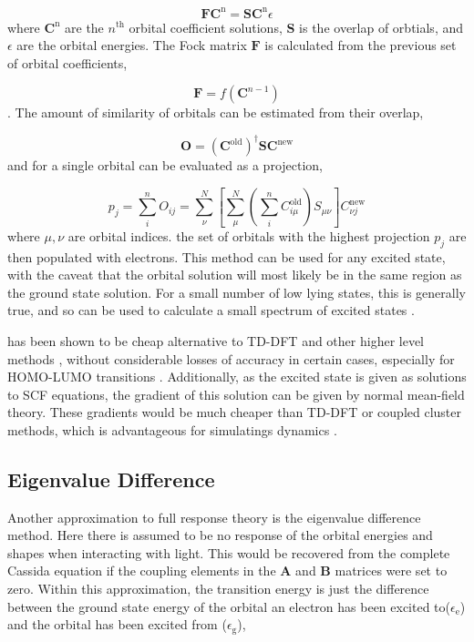 \begin{equation}
\mathbf{F} \mathbf{C}^{\text{n}} = \mathbf{S} \mathbf{C}^{\text{n}} \epsilon
\label{eq:roothaan_hall}
\end{equation}
%
where $\mathbf{C}^{\text{n}}$ are the $n^{\text{th}}$ orbital coefficient solutions, 
$\mathbf{S}$ is the overlap of orbtials, and $\epsilon$ are the orbital energies. 
The Fock matrix $\mathbf{F}$ is calculated from the previous set of orbital 
coefficients,

\begin{equation}
\mathbf{F} = f\left(\mathbf{C}^{n-1}\right)
\end{equation}
%
. The amount of similarity of orbitals can be estimated from their overlap,

\begin{equation}
\mathbf{O} = \left(\mathbf{C}^{\text{old}}\right)^\dagger \mathbf{S} \mathbf{C}^{\text{new}}
\end{equation}
%
and for a single orbital can be evaluated as a projection,

\begin{equation}
p_j = \sum^n_i O_{ij} = \sum^N_\nu \left[\sum^N_\mu\left(\sum^n_i C_{i\mu}^{\text{old}}\right)S_{\mu\nu}\right]C^{\text{new}}_{\nu j}
\end{equation}
%
where $\mu,\nu$ are orbital indices. the set of orbitals with the highest projection
$p_j$ are then populated with electrons.  This method can be used for any
excited state, with the caveat that the orbital solution will most likely be in
the same region as the ground state solution. For a small number of low lying states,
this is generally  true, and so \dscf can be used to calculate a small spectrum of
excited states \cite{Gilbert2008}.

\dscf has been shown to be cheap alternative to TD-DFT and other higher level
methods \cite{Liu2004, Gavnholt2008, Besley2009}, without considerable losses of
accuracy in certain cases, especially for HOMO-LUMO transitions \cite{Kowalczyk2011}.
Additionally, as the excited state is given as solutions to SCF equations,
the gradient of this solution can be given by normal mean-field theory.
These gradients would be much cheaper than TD-DFT or coupled cluster methods, 
which is advantageous for simulatings dynamics \cite{Gavnholt2008}.

\subsection{Eigenvalue Difference}
\label{subsec:eigval_diff}
Another approximation to full response theory is the eigenvalue difference method. 
Here there is assumed to be no response of the orbital energies and shapes when 
interacting with light. This would be recovered from the complete Cassida equation
if the coupling elements in the $\mathbf{A}$ and $\mathbf{B}$ matrices were set to zero.
Within this approximation, the transition energy is just the difference between 
the ground state energy of the orbital an electron has been excited to($\epsilon_{\text{e}}$)
and the orbital has been excited from ($\epsilon_{\text{g}}$),

